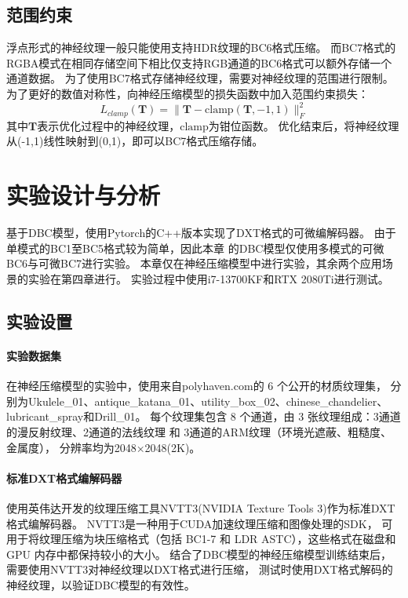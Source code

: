 \subsection{范围约束}
\label{范围约束}

浮点形式的神经纹理一般只能使用支持HDR纹理的BC6格式压缩。
而BC7格式的RGBA模式在相同存储空间下相比仅支持RGB通道的BC6格式可以额外存储一个通道数据。
为了使用BC7格式存储神经纹理，需要对神经纹理的范围进行限制。
为了更好的数值对称性，向神经压缩模型的损失函数中加入范围约束损失：
\begin{equation}
L_{clamp}(\mathbf{T})=\|\mathbf{T}-\text{clamp}(\mathbf{T},-1,1)\|_F^2
\end{equation}
其中$\mathbf{T}$表示优化过程中的神经纹理，$\text{clamp}$为钳位函数。
优化结束后，将神经纹理从(-1,1)线性映射到(0,1)，即可以BC7格式压缩存储。


\section{实验设计与分析}

基于DBC模型，使用Pytorch的C++版本实现了DXT格式的可微编解码器。
由于单模式的BC1至BC5格式较为简单，因此本章
的DBC模型仅使用多模式的可微BC6与可微BC7进行实验。
本章仅在神经压缩模型中进行实验，其余两个应用场景的实验在第四章进行。
实验过程中使用i7-13700KF和RTX 2080Ti进行测试。

\subsection{实验设置}

\paragraph{实验数据集}

在神经压缩模型的实验中，使用来自polyhaven.com\cite{PolyHaven}的 6 个公开的材质纹理集，
分别为Ukulele\_01、antique\_katana\_01、utility\_box\_02、chinese\_chandelier、
lubricant\_spray和Drill\_01。
每个纹理集包含 8 个通道，由 3 张纹理组成：3通道的漫反射纹理、2通道的法线纹理 和 3通道的ARM纹理（环境光遮蔽、粗糙度、金属度），
分辨率均为2048×2048(2K)。

\paragraph{标准DXT格式编解码器}

使用英伟达开发的纹理压缩工具NVTT3\cite{NVTT3}(NVIDIA Texture Tools 3)作为标准DXT格式编解码器。
NVTT3是一种用于CUDA加速纹理压缩和图像处理的SDK，
可用于将纹理压缩为块压缩格式（包括 BC1-7 和 LDR ASTC），这些格式在磁盘和 GPU 内存中都保持较小的大小。
结合了DBC模型的神经压缩模型训练结束后，需要使用NVTT3对神经纹理以DXT格式进行压缩，
测试时使用DXT格式解码的神经纹理，以验证DBC模型的有效性。

